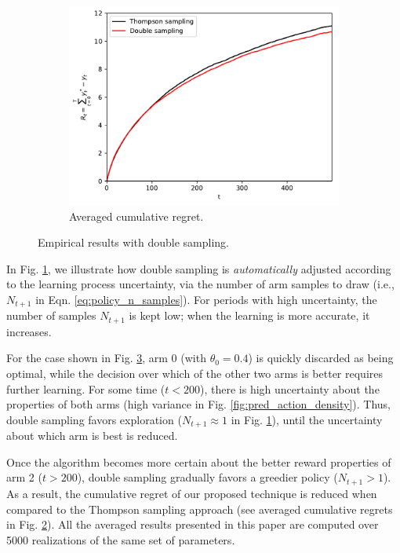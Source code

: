 \documentclass[10pt]{article}
\newcommand{\ie}{i.e., }
\begin{document}
\begin{figure}[!h]
\begin{subfigure}[b]{0.33\textwidth}
		\label{fig:n_samples}
	\end{subfigure}
	\begin{subfigure}[b]{0.33\textwidth}
		\includegraphics[width=\textwidth]{./figs/bernoulli/cumulative_regret.pdf}
		\caption{Averaged cumulative regret.}
		\label{fig:cumulative_regret}
	\end{subfigure}
	\caption{Empirical results with double sampling.}
	\label{fig:approach_intuition}
\end{figure}

In Fig. \ref{fig:n_samples}, we illustrate how double sampling is {\em automatically} adjusted according to the learning process uncertainty, via the number of arm samples to draw (\ie $N_{t+1}$ in Eqn. \ref{eq:policy_n_samples}). For periods with high uncertainty, the number of samples $N_{t+1}$ is kept low; when the learning is more accurate, it increases.

For the case shown in Fig. \ref{fig:approach_intuition}, arm 0 (with $\theta_0=0.4$) is quickly discarded as being optimal, while the decision over which of the other two arms is better requires further learning. For some time ($t<200$), there is high uncertainty about the properties of both arms (high variance in Fig. \ref{fig:pred_action_density}). Thus, double sampling favors exploration ($N_{t+1}\approx 1$ in Fig. \ref{fig:n_samples}), until the uncertainty about which arm is best is reduced.

Once the algorithm becomes more certain about the better reward properties of arm 2 ($t>200$), double sampling gradually favors a greedier policy ($N_{t+1}>1$). As a result, the cumulative regret of our proposed technique is reduced when compared to the Thompson sampling approach (see averaged cumulative regrets in Fig. \ref{fig:cumulative_regret}). All the averaged results presented in this paper are computed over 5000 realizations of the same set of parameters.
\end{document}
